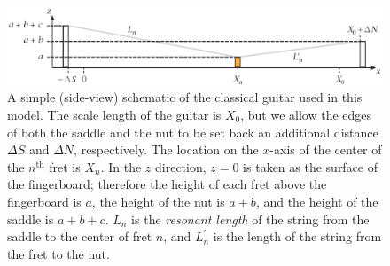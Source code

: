  \begin{figure}
  \centering
  \includegraphics[width=6.0in]{figures/guitar_schematic}
  \caption{\label{fig:guitar_schematic} A simple (side-view) schematic of the classical guitar used in this model. The scale length of the guitar is $X_0$, but we allow the edges of both the saddle and the nut to be set back an additional distance $\Delta S$ and $\Delta N$, respectively. The location on the $x$-axis of the center of the $n^\textrm{th}$ fret is $X_n$. In the $z$ direction, $z = 0$ is taken as the surface of the fingerboard; therefore the height of each fret above the fingerboard is $a$, the height of the nut is $a + b$, and the height of the saddle is $a + b + c$. $L_n$ is the \emph{resonant length} of the string from the saddle to the center of fret $n$, and $L^\prime_n$ is the length of the string from the fret to the nut. }
 \end{figure}

